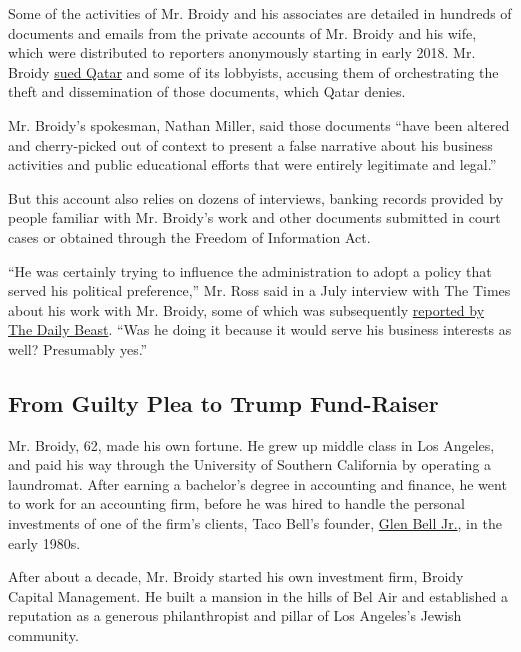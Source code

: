 Some of the activities of Mr. Broidy and his associates are detailed in
hundreds of documents and emails from the private accounts of Mr. Broidy
and his wife, which were distributed to reporters anonymously starting
in early 2018. Mr. Broidy
\href{https://www.nytimes.com/2018/03/26/world/middleeast/elliott-broidy-qatar-lawsuit.html}{sued
Qatar} and some of its lobbyists, accusing them of orchestrating the
theft and dissemination of those documents, which Qatar denies.

Mr. Broidy's spokesman, Nathan Miller, said those documents ``have been
altered and cherry-picked out of context to present a false narrative
about his business activities and public educational efforts that were
entirely legitimate and legal.''

But this account also relies on dozens of interviews, banking records
provided by people familiar with Mr. Broidy's work and other documents
submitted in court cases or obtained through the Freedom of Information
Act.

``He was certainly trying to influence the administration to adopt a
policy that served his political preference,'' Mr. Ross said in a July
interview with The Times about his work with Mr. Broidy, some of which
was subsequently
\href{https://www.thedailybeast.com/gop-moneyman-elliott-broidy-enlisted-veteran-diplomat-amid-secret-influence-campaign}{reported
by The Daily Beast}. ``Was he doing it because it would serve his
business interests as well? Presumably yes.''

\hypertarget{from-guilty-plea-to-trump-fund-raiser}{%
\subsection{From Guilty Plea to Trump
Fund-Raiser}\label{from-guilty-plea-to-trump-fund-raiser}}

Mr. Broidy, 62, made his own fortune. He grew up middle class in Los
Angeles, and paid his way through the University of Southern California
by operating a laundromat. After earning a bachelor's degree in
accounting and finance, he went to work for an accounting firm, before
he was hired to handle the personal investments of one of the firm's
clients, Taco Bell's founder,
\href{https://www.nytimes.com/2010/01/19/business/19bell.html}{Glen Bell
Jr.}, in the early 1980s.

After about a decade, Mr. Broidy started his own investment firm, Broidy
Capital Management. He built a mansion in the hills of Bel Air and
established a reputation as a generous philanthropist and pillar of Los
Angeles's Jewish community.

